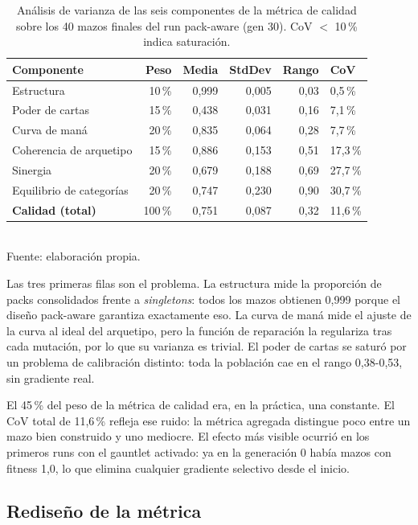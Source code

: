 \begin{table}[H]
\centering
\caption{Análisis de varianza de las seis componentes de la métrica de calidad sobre los 40 mazos finales del run pack-aware (gen 30). CoV $<$ 10\,\% indica saturación.}
\label{tab:cov-quality}
\begin{tabular}{lrrrrl}
\toprule
\textbf{Componente} & \textbf{Peso} & \textbf{Media} & \textbf{StdDev} & \textbf{Rango} & \textbf{CoV} \\
\midrule
Estructura                & 10\,\% & 0,999 & 0,005 & 0,03 & 0,5\,\% \\
Poder de cartas           & 15\,\% & 0,438 & 0,031 & 0,16 & 7,1\,\% \\
Curva de maná             & 20\,\% & 0,835 & 0,064 & 0,28 & 7,7\,\% \\
\midrule
Coherencia de arquetipo   & 15\,\% & 0,886 & 0,153 & 0,51 & 17,3\,\% \\
Sinergia                  & 20\,\% & 0,679 & 0,188 & 0,69 & 27,7\,\% \\
Equilibrio de categorías  & 20\,\% & 0,747 & 0,230 & 0,90 & 30,7\,\% \\
\midrule
\textbf{Calidad (total)} & 100\,\% & 0,751 & 0,087 & 0,32 & 11,6\,\% \\
\bottomrule
\end{tabular}
\\[2pt]{\footnotesize Fuente: elaboración propia.}
\end{table}

Las tres primeras filas son el problema. La estructura mide la proporción de packs consolidados frente a \emph{singletons}: todos los mazos obtienen 0,999 porque el diseño pack-aware garantiza exactamente eso. La curva de maná mide el ajuste de la curva al ideal del arquetipo, pero la función de reparación la regulariza tras cada mutación, por lo que su varianza es trivial. El poder de cartas se saturó por un problema de calibración distinto: toda la población cae en el rango 0,38-0,53, sin gradiente real.

El 45\,\% del peso de la métrica de calidad era, en la práctica, una constante. El CoV total de 11,6\,\% refleja ese ruido: la métrica agregada distingue poco entre un mazo bien construido y uno mediocre. El efecto más visible ocurrió en los primeros runs con el gauntlet activado: ya en la generación 0 había mazos con fitness 1,0, lo que elimina cualquier gradiente selectivo desde el inicio.

\subsection{Rediseño de la métrica}

